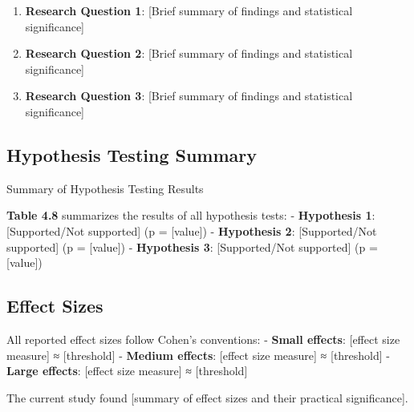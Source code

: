 \documentclass[
  12pt,
  letterpaper,
  12pt,
  letterpaper,
  oneside]{report}
\newenvironment{Shaded}{\begin{snugshade}}{\end{snugshade}}
\newcommand{\CommentTok}[1]{\textcolor[rgb]{0.37,0.37,0.37}{#1}}
\providecommand{\tightlist}{%
  \setlength{\itemsep}{0pt}\setlength{\parskip}{0pt}}
\begin{document}
\begin{enumerate}
\def\labelenumi{\arabic{enumi}.}
\tightlist
\item
  \textbf{Research Question 1}: {[}Brief summary of findings and
  statistical significance{]}
\item
  \textbf{Research Question 2}: {[}Brief summary of findings and
  statistical significance{]}
\item
  \textbf{Research Question 3}: {[}Brief summary of findings and
  statistical significance{]}
\end{enumerate}

\subsection{Hypothesis Testing
Summary}\label{hypothesis-testing-summary}

\begin{table}

\caption{\label{tbl-hypothesis-summary}Summary of Hypothesis Testing
Results}

\centering{

\begin{Shaded}
\begin{Highlighting}[]
\CommentTok{\# Summary table of all hypotheses will be generated here}
\end{Highlighting}
\end{Shaded}

}

\end{table}%

\textbf{Table 4.8} summarizes the results of all hypothesis tests: -
\textbf{Hypothesis 1}: {[}Supported/Not supported{]} (p = {[}value{]}) -
\textbf{Hypothesis 2}: {[}Supported/Not supported{]} (p = {[}value{]}) -
\textbf{Hypothesis 3}: {[}Supported/Not supported{]} (p = {[}value{]})

\subsection{Effect Sizes}\label{effect-sizes}

All reported effect sizes follow Cohen's conventions: - \textbf{Small
effects}: {[}effect size measure{]} ≈ {[}threshold{]} - \textbf{Medium
effects}: {[}effect size measure{]} ≈ {[}threshold{]} - \textbf{Large
effects}: {[}effect size measure{]} ≈ {[}threshold{]}

The current study found {[}summary of effect sizes and their practical
significance{]}.
\end{document}
